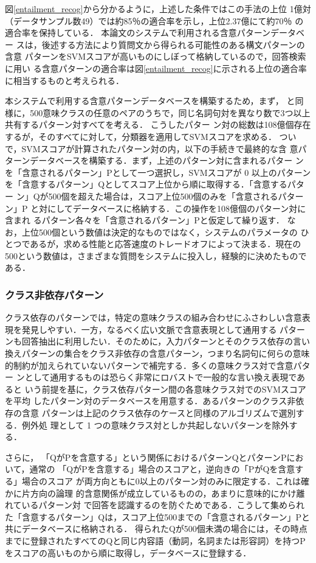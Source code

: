 \documentclass[japanese]{jnlp_1.4}
\begin{document}
図\ref{entailment_recog}から分かるように，上述した条件ではこの手法の上位
1億対（データサンプル数49）では約85％の適合率を示し，上位2.37億にて約70％
の適合率を保持している．
本論文のシステムで利用される含意パターンデータベー
スは，後述する方法により質問文から得られる可能性のある構文パターンの含意
パターンをSVMスコアが高いものにしぼって格納しているので，回答検索に用い
る含意パターンの適合率は図\ref{entailment_recog}に示される上位の適合率に相当するものと考えられる．

本システムで利用する含意パターンデータベースを構築するため，まず，
\cite{Kloetzer2012}と同様に，500意味クラスの任意のペアのうちで，同じ名詞句対を異なり数で3つ以上共有するパターン対すべてを考える．
こうしたパター
ン対の総数は108億個存在するが，そのすべてに対して，分類器を適用してSVMスコアを求める．
ついで，SVMスコアが計算されたパターン対の内，以下の手続きで最終的な含
意パターンデータベースを構築する．まず，上述のパターン対に含まれるパター
ンを「含意されるパターン」Pとして一つ選択し，SVMスコアが 0 以上のパターン
を「含意するパターン」Qとしてスコア上位から順に取得する．「含意するパター
ン」Qが500個を超えた場合は，スコア上位500個のみを「含意されるパターン」P
と対にしてデータベースに格納する．この操作を108億個のパターン対に含まれ
るパターン各々を「含意されるパターン」Pと仮定して繰り返す．
なお，上位500個という数値は決定的なものではなく，システムのパラメータの
ひとつであるが，求める性能と応答速度のトレードオフによって決まる．現在の
500という数値は，さまざまな質問をシステムに投入し，経験的に決めたもので
ある．


\subsubsection{クラス非依存パターン}

クラス依存のパターンでは，特定の意味クラスの組み合わせにふさわしい含意表
現を発見しやすい．一方，なるべく広い文脈で含意表現として通用する
パターンも回答抽出に利用したい．そのために，入力パターンとそのクラス依存の言い
換えパターンの集合をクラス非依存の含意パターン，つまり名詞句に何らの意味
的制約が加えられていないパターンで補完する．多くの意味クラス対で含意パター
ンとして通用するものは恐らく非常にロバストで一般的な言い換え表現であると
いう前提を基に，クラス依存パターン間の各意味クラス対でのSVMスコアを平均
したパターン対のデータベースを用意する．あるパターンのクラス非依存の含意
パターンは上記のクラス依存のケースと同様のアルゴリズムで選別する．例外処
理として 1 つの意味クラス対としか共起しないパターンを除外する．


さらに，
「QがPを含意する」という関係におけるパターンQとパターンPにおいて，通常の
「QがPを含意する」場合のスコアと，逆向きの「PがQを含意する」場合のスコア
が両方向ともに0以上のパターン対のみに限定する．これは確かに片方向の論理
的含意関係が成立しているものの，あまりに意味的にかけ離れているパターン対
で回答を認識するのを防ぐためである．こうして集められた「含意するパターン」Qは，スコア上位500までの「含意されるパターン」Pと共にデータベースに格納される．
得られたQが500個未満の場合には，その時点までに登録されたすべてのQと同じ内容語（動詞，名詞または形容詞）を持つPをスコアの高いものから順に取得し，データベースに登録する．
 
\end{document}
